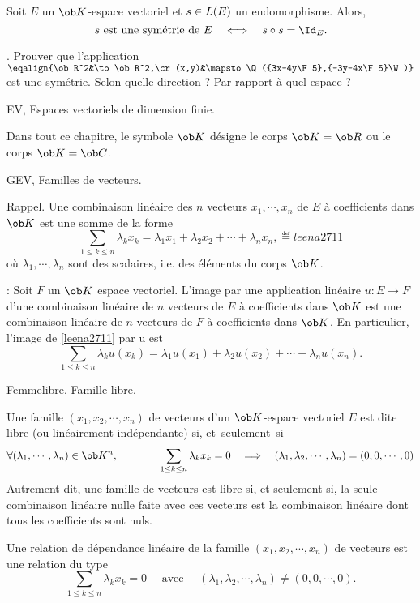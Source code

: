 \Propriete []  Soit $E$ un $\ob K$-espace vectoriel et $s\in\sc L(E)$ un endomorphisme. Alors, 
$$
{s\mbox{ est une sym\'etrie de }E\quad \Longleftrightarrow\quad s\circ s=\Id_E}.
$$


\Exercice. Prouver que l'application $\eqalign{\ob R^2&\to \ob R^2,\cr(x,y)&\mapsto  \Q({3x-4y\F5},{-3y-4x\F5}\W)}$ est une sym\'etrie. Selon quelle direction ? Par rapport \`a quel espace ?




\pagetitretrue


\Chapter EV, Espaces vectoriels de dimension finie.
\bigskip

\noindent
Dans tout ce chapitre, le symbole $\ob K$ d\'esigne le corps $\ob K=\ob R$ ou le corps $\ob K=\ob C$. 
\bigskip

\Section GEV, Familles de vecteurs.
\bigskip

\noindent
\mbox{Rappel.} Une combinaison lin\'eaire des $n$ vecteurs $x_1,\cdots, x_n$ de $E$ \`a coefficients dans $\ob K$ est une somme de la forme
$$
\sum_{1\le k\le n}\lambda_kx_k=\lambda_1x_1+\lambda_2x_2+\cdots+\lambda_nx_n, \eqdef{leena2711}
$$
o\`u $\lambda_1,\cdots,\lambda_n$ sont des scalaires, i.e. des \'el\'ements du corps $\ob K$. 
\bigskip

\Remarque : Soit $F$ un $\ob K$ espace vectoriel. L'image par une application lin\'eaire $u:E\to F$ d'une combinaison lin\'eaire de $n$ vecteurs 
de $E$ \`a coefficients dans $\ob K$ est une combinaison lin\'eaire de $n$ vecteurs de $F$ \`a coefficients dans $\ob K$. En particulier, l'image de \eqref{leena2711} par u est 
$$
\sum_{1\le k\le n}\lambda_ku(x_k)=\lambda_1u(x_1)+\lambda_2u(x_2)+\cdots+\lambda_nu(x_n).
$$

\Subsection Femmelibre, Famille libre. 
\bigskip

\Definition []  Une famille $(x_1,x_2,\cdots,x_n)$ de vecteurs d'un $\ob K$-espace vectoriel $E$ est dite libre (ou lin\'eairement ind\'ependante) si, et~seulement~si 
$$
\forall(\lambda_1,\cdots,\lambda_n)\in\ob K^n, \qquad\qquad {\sum_{1\le k\le n}\lambda_kx_k=0\quad \Longrightarrow\quad (\lambda_1,\lambda_2,\cdots,\lambda_n)=(0,0,\cdots,0)}
$$
Autrement dit, une famille de vecteurs est libre si, et seulement si, la seule combinaison lin\'eaire nulle faite avec ces vecteurs 
est la combinaison lin\'eaire dont tous les coefficients sont nuls. 
\bigskip

\Definition []  Une relation de d\'ependance lin\'eaire de la famille $(x_1,x_2,\cdots,x_n)$ de vecteurs est une relation du type
$$
\sum_{1\le k\le n}\lambda_kx_k=0\quad\mbox{ avec }\quad(\lambda_1,\lambda_2,\cdots,\lambda_n)\neq(0,0,\cdots,0). 
$$

